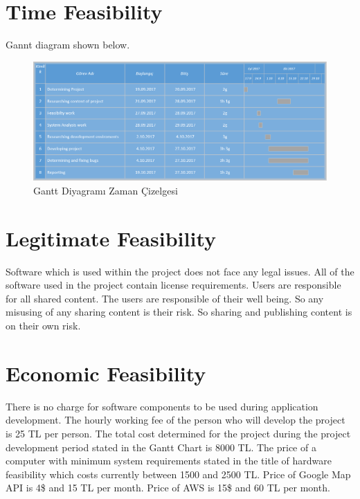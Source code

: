 \section{Time Feasibility}
Gannt diagram shown below.
\begin{figure}[!htbp]
\centering
\includegraphics[width=\textwidth]{projectChapters/images/gantt.png}
\caption{Gantt Diyagramı Zaman Çizelgesi}
\end{figure}


\section{Legitimate Feasibility}
Software which is used within the project does not face any legal issues. All of the
software used in the project contain license requirements. Users are responsible for
all shared content. The users are responsible of their well being. So any misusing of 
any sharing content is their risk. So sharing and publishing content is on their own risk.


\section{Economic Feasibility}
There is no charge for software components to be used during application development. The hourly working fee of the person who will develop the project is 25 TL per person. The total cost determined for the project during the project development period stated in the Gantt Chart is 8000 TL. The price of a computer with minimum system requirements stated in the title of hardware feasibility which costs currently between 1500 and 2500 TL. Price of Google Map API is 4\$ and 15 TL per month. Price of AWS is 15\$ and 60 TL per month.

